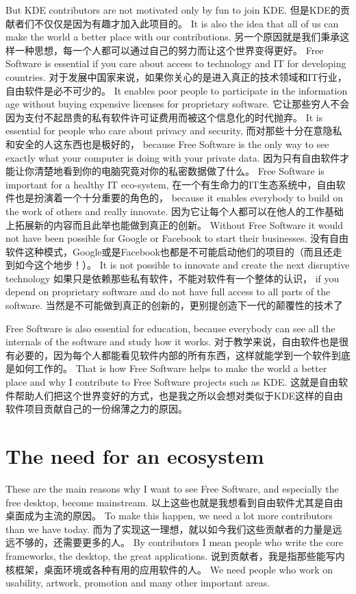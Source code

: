 But KDE contributors are not motivated only by fun to join KDE.
但是KDE的贡献者们不仅仅是因为有趣才加入此项目的。
It is also the idea that all of us can make the world a better place with our contributions.
另一个原因就是我们秉承这样一种思想，每一个人都可以通过自己的努力而让这个世界变得更好。
Free Software is essential if you care about access to technology and IT for developing countries.
对于发展中国家来说，如果你关心的是进入真正的技术领域和IT行业，自由软件是必不可少的。
It enables poor people to participate in the information age without buying expensive licenses for proprietary software.
它让那些穷人不会因为支付不起昂贵的私有软件许可证费用而被这个信息化的时代抛弃。
It is essential for people who care about privacy and security, 
而对那些十分在意隐私和安全的人这东西也是极好的，
because Free Software is the only way to see exactly what your computer is doing with your private data.
因为只有自由软件才能让你清楚地看到你的电脑究竟对你的私密数据做了什么。
Free Software is important for a healthy IT eco-system,
在一个有生命力的IT生态系统中，自由软件也是扮演着一个十分重要的角色的，
because it enables everybody to build on the work of others and really innovate.
因为它让每个人都可以在他人的工作基础上拓展新的内容而且此举也能做到真正的创新。
Without Free Software it would not have been possible for Google or Facebook to start their businesses.
没有自由软件这种模式，Google或是Facebook也都是不可能启动他们的项目的（而且还走到如今这个地步！）。
It is not possible to innovate and create the next disruptive technology
如果只是依赖那些私有软件，不能对软件有一个整体的认识，
if you depend on proprietary software and do not have full access to all parts of the software.
当然是不可能做到真正的创新的，更别提创造下一代的颠覆性的技术了

Free Software is also essential for education, because everybody can see all the internals of the software and study how it works. 
对于教学来说，自由软件也是很有必要的，因为每个人都能看见软件内部的所有东西，这样就能学到一个软件到底是如何工作的。
That is how Free Software helps to make the world a better place and why I contribute to Free Software projects such as KDE.
这就是自由软件帮助人们把这个世界变好的方式，也是我之所以会想对类似于KDE这样的自由软件项目贡献自己的一份绵薄之力的原因。

\section*{The need for an ecosystem}

These are the main reasons why I want to see Free Software, and especially the free desktop, become mainstream.
以上这些也就是我想看到自由软件尤其是自由桌面成为主流的原因。
 To make this happen, we need a lot more contributors than we have today.
而为了实现这一理想，就以如今我们这些贡献者的力量是远远不够的，还需要更多的人。
 By contributors I mean people who write the core frameworks, the desktop, the great applications.
说到贡献者，我是指那些能写内核框架，桌面环境或各种有用的应用软件的人。
 We need people who work on usability, artwork, promotion and many other important areas. 
 
